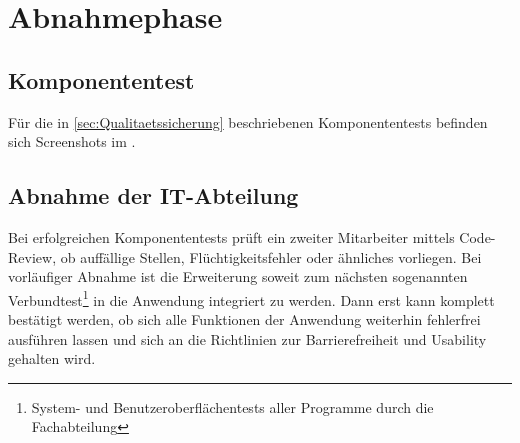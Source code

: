 \section{Abnahmephase} 
\label{sec:Abnahmephase}

\subsection{Komponententest}

Für die in \ref{sec:Qualitaetssicherung} beschriebenen Komponententests befinden sich Screenshots im .

\subsection{Abnahme der IT-Abteilung}

Bei erfolgreichen Komponententests prüft ein zweiter Mitarbeiter mittels Code-Review, ob auffällige Stellen, Flüchtigkeitsfehler oder ähnliches vorliegen. Bei vorläufiger Abnahme ist die Erweiterung soweit zum nächsten sogenannten Verbundtest\footnote{System- und Benutzeroberflächentests aller Programme durch die Fachabteilung} in die Anwendung integriert zu werden. Dann erst kann komplett bestätigt werden, ob sich alle Funktionen der Anwendung weiterhin fehlerfrei ausführen lassen und sich an die Richtlinien zur Barrierefreiheit und Usability gehalten wird.


